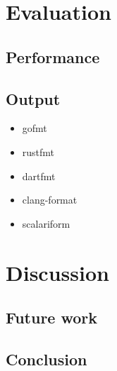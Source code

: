 \documentclass[11pt,a4paper]{article}
\begin{document}
\section{Evaluation}
\subsection{Performance}
\subsection{Output}
\begin{itemize}
  \item gofmt
  \item rustfmt
  \item dartfmt
  \item clang-format
  \item scalariform
\end{itemize}
\section{Discussion}
\subsection{Future work}
\subsection{Conclusion}
\printbibliography{}
\end{document}
